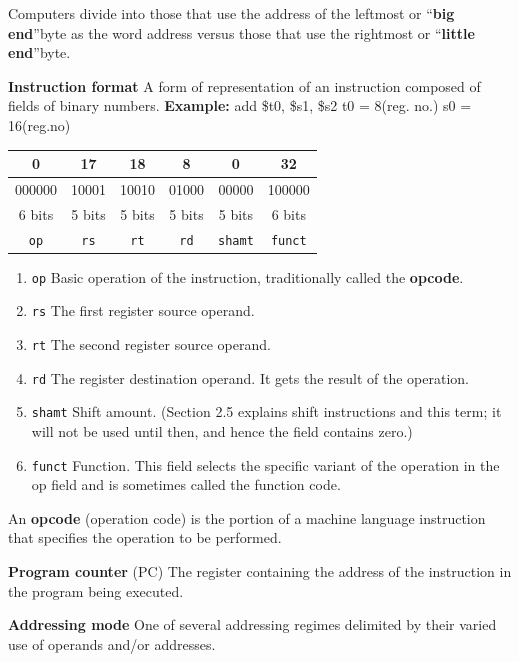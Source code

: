 \documentclass[a4paper,oneside]{book}
\begin{document}
\begin{definition}
Computers divide into those that use the address of the leftmost or \textquotedblleft\textbf{big end}\textquotedblright byte as the word address versus those that use the rightmost or \textquotedblleft\textbf{little end}\textquotedblright byte.
\end{definition}
\begin{definition}
\textbf{Instruction format} A form of representation of an instruction composed of fields of binary numbers.
\textbf{Example: } add \$t0, \$s1, \$s2
t0 = 8(reg. no.) s0 = 16(reg.no)\\
\begin{tabular}[H]{|c|c|c|c|c|c|}
\hline
0 & 17 & 18 & 8 & 0 & 32 \\ \hline
000000 & 10001 & 10010 & 01000 & 00000 & 100000 \\ \hline
6 bits & 5 bits & 5 bits & 5 bits & 5 bits & 6 bits \\ \hline
\texttt{op} & \texttt{rs} & \texttt{rt} & \texttt{rd} & \texttt{shamt} & \texttt{funct} \\ \hline 
\end{tabular}
\begin{enumerate}
\item \texttt{op} Basic operation of the instruction, traditionally called the \textbf{opcode}.
\item \texttt{rs} The first register source operand.
\item \texttt{rt} The second register source operand.
\item \texttt{rd} The register destination operand. It gets the result of the operation.
\item \texttt{shamt} Shift amount. (Section 2.5 explains shift instructions and this term;
it will not be used until then, and hence the field contains zero.)
\item \texttt{funct}  Function. This field selects the specific variant of the operation in the
op field and is sometimes called the function code.
\end{enumerate}
\end{definition}
\begin{definition}[Opcode]
An \textbf{opcode} (operation code) is the portion of a machine language instruction that specifies the operation to be performed.
\end{definition}
\begin{definition}
\textbf{Program counter} (PC) The register containing the address of the instruction in the program being executed.
\end{definition}
\begin{definition}
\textbf{Addressing mode} One of several addressing regimes delimited by their varied use of operands and/or addresses.
\end{definition}
\end{document}
